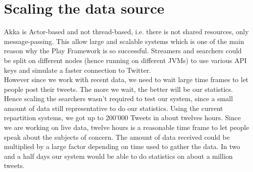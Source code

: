 \section{Scaling the data source}

Akka is Actor-based and not thread-based, i.e. there is not shared resources, only message-passing. This allow large and scalable systems which is one of the main reason why the Play Framework is so successful. Streamers and searchers could be split on different nodes (hence running on different JVMs) to use various API keys and simulate a faster connection to Twitter.\\

However since we work with recent data, we need to wait large time frames to let people post their tweets. The more we wait, the better will be our statistics. \\

Hence scaling the searchers wasn't required to test our system, since a small amount of data still representative to do our statistics. Using the current repartition systems, we got up to 200'000 Tweets in about twelves hours. Since we are working on live data, twelve hours is a reasonable time frame to let people speak about the subjects of concern. The amount of data received could be multiplied by a large factor depending on time used to gather the data. In two and a half days our system would be able to do statistics on about a million tweets.